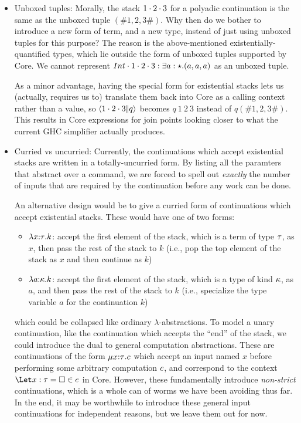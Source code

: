 \documentclass{article}
\begin{document}
\begin{itemize}
\item Unboxed tuples: Morally, the stack ${1}\cdot{{2}\cdot{3}}$ for a polyadic
  continuation is the same as the unboxed tuple $(\# 1, 2, 3 \#)$.  Why then do
  we bother to introduce a new form of term, and a new type, instead of just
  using unboxed tuples for this purpose?  The reason is the above-mentioned
  existentially-quantified types, which lie outside the form of unboxed tuples
  supported by Core.  We cannot represent
  ${Int}\cdot{{1}\cdot{{2}\cdot{3}}} : \exists{a:\star}.({a, a, a})$ as an unboxed
  tuple.

  As a minor advantage, having the special form for existential stacks lets us
  (actually, requires us to) translate them back into Core as a calling context
  rather than a value, so $\left\langle{{1}\cdot{{2}\cdot{3}}}\middle|\!\middle|{q}\right\rangle$ becomes $q ~ 1 ~ 2 ~ 3$
  instead of $q (\# 1, 2, 3 \#)$.  This results in Core expressions for join
  points looking closer to what the current GHC simplifier actually produces.

\item Curried vs uncurried: Currently, the continuations which accept
  existential stacks are written in a totally-uncurried form.  By listing all
  the paramters that abstract over a command, we are forced to spell out
  \emph{exactly} the number of inputs that are required by the continuation
  before any work can be done.

  An alternative design would be to give a curried form of continuations which
  accept existential stacks.  These would have one of two forms:
  \begin{itemize}
  \item $\lambda{x{:}{\tau}}.k$: accept the first element of the stack, which is a
    term of type $\tau$, as $x$, then pass the rest of the stack to $k$ (i.e.,
    pop the top element of the stack as $x$ and then continue as $k$)
  \item $\lambda{a{:}{\kappa}}.k$: accept the first element of the stack, which is a
    type of kind $\kappa$, as $a$, and then pass the rest of the stack to $k$
    (i.e., specialize the type variable $a$ for the continuation $k$)
  \end{itemize}
  which could be collapsed like ordinary $\lambda$-abstractions.  To model a
  unary continuation, like the continuation which accepts the ``end'' of the
  stack, we could introduce the dual to general computation abstractions.  These
  are continuations of the form $\mu{x{:}{\tau}}.c$ which accept an input
  named $x$ before performing some arbitrary computation $c$, and correspond
  to the context $\Let x:\ty = \hole \in e$ in Core.  However, these
  fundamentally introduce \emph{non-strict} continuations, which is a whole can
  of worms we have been avoiding thus far.  In the end, it may be worthwhile to
  introduce these general input continuations for independent reasons, but we
  leave them out for now.


\end{itemize}
\end{document}
